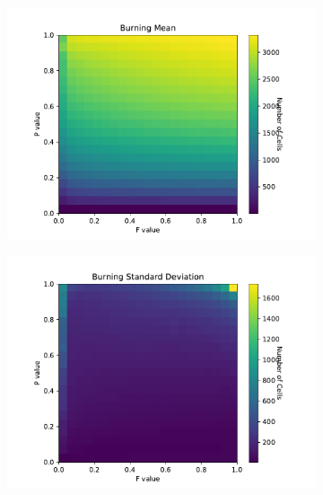 \documentclass{article}
\begin{document}
\begin{figure}[H]
\centering
\begin{subfigure}{.5\textwidth}
    \centering
    \includegraphics[scale=0.4]{Burning Mean.pdf}
    \label{fig:burnmean}
\end{subfigure}%
\begin{subfigure}{.5\textwidth}
    \centering
    \includegraphics[scale=0.4]{Burning STD.pdf}
    \label{fig:burnstd}
\end{subfigure}
\label{fig:burn}
\end{figure}
\end{document}
